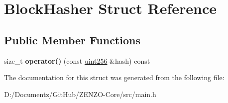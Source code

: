 \hypertarget{struct_block_hasher}{}\section{Block\+Hasher Struct Reference}
\label{struct_block_hasher}
\subsection*{Public Member Functions}
\begin{DoxyCompactItemize}
\item 
\mbox{\label{struct_block_hasher_a10db0b419e8c9d86e848655a13b83490}} 
size\+\_\+t {\bfseries operator()} (const \mbox{\hyperlink{classuint256}{uint256}} \&hash) const
\end{DoxyCompactItemize}


The documentation for this struct was generated from the following file\+:\begin{DoxyCompactItemize}
\item 
D\+:/\+Documentz/\+Git\+Hub/\+Z\+E\+N\+Z\+O-\/\+Core/src/main.\+h\end{DoxyCompactItemize}
